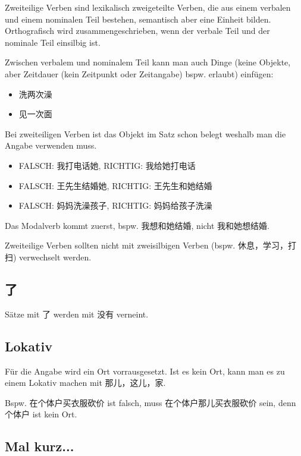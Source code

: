 \documentclass[UTF8]{ctexart}
\begin{document}
Zweiteilige Verben sind lexikalisch zweigeteilte Verben, die aus einem verbalen und einem nominalen Teil bestehen, semantisch aber eine Einheit bilden. Orthografisch wird zusammengeschrieben, wenn der verbale Teil und der nominale Teil einsilbig ist.

Zwischen verbalem und nominalem Teil kann man auch Dinge (keine Objekte, aber Zeitdauer (kein Zeitpunkt oder Zeitangabe) bspw. erlaubt) einfügen:

\begin{itemize}
    \item 洗两次澡
    \item 见一次面
\end{itemize}

Bei zweiteiligen Verben ist das Objekt im Satz schon belegt weshalb man die Angabe verwenden muss.

\begin{itemize}
    \item FALSCH: 我打电话她, RICHTIG: 我给她打电话
    \item FALSCH: 王先⽣结婚她, RICHTIG: 王先⽣和她结婚
    \item FALSCH: 妈妈洗澡孩⼦, RICHTIG: 妈妈给孩⼦洗澡
\end{itemize}

Das Modalverb kommt zuerst, bspw. 我想和她结婚, nicht 我和她想结婚.

Zweiteilige Verben sollten nicht mit zweisilbigen Verben (bspw. 休息，学习，打扫) verwechselt werden.

\subsection{了}

Sätze mit 了 werden mit 没有 verneint.

\subsection{Lokativ}

Für die Angabe wird ein Ort vorrausgesetzt. Ist es kein Ort, kann man es zu einem Lokativ machen mit 那儿，这儿，家.

Bspw. 在个体户买衣服砍价 ist falsch, muss 在个体户那儿买衣服砍价 sein, denn 个体户 ist kein Ort.\\

\subsection{Mal kurz...}
\end{document}
